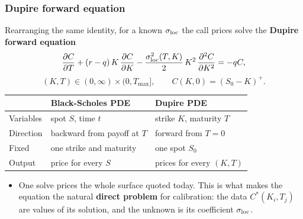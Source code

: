\begin{frame}
\frametitle{Dupire forward equation}
\begin{scriptsize}
Rearranging the same identity, for a known $\sigma_{\mathrm{loc}}$ the call prices solve the \textbf{Dupire forward equation}
\begin{equation}\label{eq:dupire_forward}
    \frac{\partial C}{\partial T} + (r-q)\,K\,\frac{\partial C}{\partial K}
    - \frac{\sigma_{\mathrm{loc}}^2(T,K)}{2}\,K^2\,\frac{\partial^2 C}{\partial K^2} = -qC,
\end{equation}
\begin{equation*}
    (K, T) \in (0, \infty) \times (0, T_{\max}], \qquad C(K, 0) = (S_0 - K)^+ .
\end{equation*}

\begin{center}
\begin{tabular}{l l l}
\toprule
 & Black-Scholes PDE & Dupire PDE \\
\midrule
Variables & spot $S$, time $t$ & strike $K$, maturity $T$ \\
Direction & backward from payoff at $T$ & forward from $T = 0$ \\
Fixed & one strike and maturity & one spot $S_0$ \\
Output & price for every $S$ & prices for every $(K, T)$ \\
\bottomrule
\end{tabular}
\end{center}
\medskip

\begin{itemize}
\item One solve prices the whole surface quoted today.
This is what makes the equation the natural \textbf{direct problem} for calibration:
the data $C^*(K_i, T_j)$ are values of its solution, and the unknown is its coefficient $\sigma_{\mathrm{loc}}$.
\end{itemize}
\end{scriptsize}
\end{frame}

